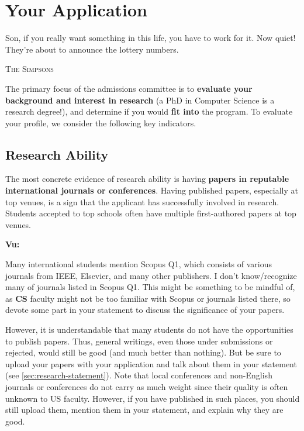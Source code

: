 \documentclass[oneside,11pt]{memoir}
\newenvironment{commentbox}[1][]{
  \small
  \begin{mybox}
    {\small \textbf{#1}}
  }{
  \end{mybox}
}
\begin{document}
\chapter{Your Application}\label{sec:application}

\epigraph{Son, if you really want something in this life, you have to work for it. Now quiet! They’re about to announce the lottery numbers.}{\textsc{The Simpsons}}


The primary focus of the admissions committee is to \textbf{evaluate your background and interest in research} (a PhD in Computer Science is a research degree!), and determine if you would \textbf{fit into} the program. To evaluate your profile, we consider
the following key indicators.

\section{Research Ability}\label{sec:research-ability}

The most concrete evidence of research ability is having \textbf{papers in reputable international journals or conferences}.
Having published papers, especially at top venues, is a sign that the applicant has successfully involved in research.  Students  accepted to top schools often have multiple first-authored papers at top venues. 

\begin{commentbox}[Vu:]
  Many international students mention Scopus Q1, which consists of various journals from IEEE, Elsevier, and many other publishers.  I don't know/recognize many of journals listed in Scopus Q1. This might be something to be mindful of, as \textbf{CS} faculty might not be too familiar with Scopus or journals listed there, so devote some part in your statement to discuss the significance of your papers.
\end{commentbox}

However, it is understandable that many students do not have the opportunities to publish papers. Thus, general writings, even those under submissions or rejected, would still be good (and much better than nothing).  But be sure to upload your papers with your application and talk about them in your statement (see \autoref{sec:research-statement}).  Note that local conferences and non-English journals or conferences do
not carry as much weight since their quality is often unknown to US faculty. However, if you have published in such places, you should still upload them, mention them in your statement, and explain why they are good.
\end{document}
